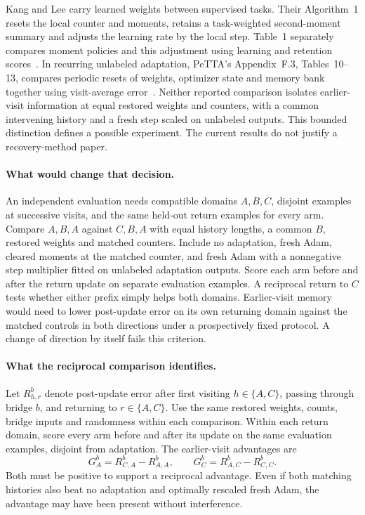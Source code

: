 \documentclass[11pt,a4paper]{article}
\begin{document}
Kang and Lee carry learned weights between supervised tasks. Their
Algorithm~1 resets the local counter and moments, retains a task-weighted
second-moment summary and adjusts the learning rate by the local step.
Table~1 separately compares moment policies and this adjustment using
learning and retention scores~\cite{continualadam}. In recurring
unlabeled adaptation, PeTTA's Appendix~F.3, Tables~10--13, compares
periodic resets of weights, optimizer state and memory bank together
using visit-average error~\cite{petta}. Neither reported comparison
isolates earlier-visit information at equal restored weights and counters,
with a common intervening history and a fresh step scaled on unlabeled
outputs. This bounded distinction defines a possible experiment.
The current results do not justify a recovery-method paper.

\paragraph{What would change that decision.}
An independent evaluation needs compatible domains $A,B,C$, disjoint
examples at successive visits, and the same held-out return examples
for every arm. Compare $A,B,A$ against $C,B,A$ with equal history
lengths, a common $B$, restored weights and matched counters. Include
no adaptation, fresh Adam, cleared moments at the matched counter, and
fresh Adam with a nonnegative step multiplier fitted on unlabeled
adaptation outputs. Score each arm before and after the return update
on separate evaluation examples. A reciprocal return to $C$ tests
whether either prefix simply helps both domains. Earlier-visit memory
would need to lower post-update error on its own returning domain
against the matched controls in both directions under a prospectively
fixed protocol. A change of direction by itself fails this criterion.

\paragraph{What the reciprocal comparison identifies.}
Let $R_{h,r}^{b}$ denote post-update error after first visiting
$h\in\{A,C\}$, passing through bridge $b$, and returning to $r\in\{A,C\}$.
Use the same restored weights, counts, bridge inputs and randomness within
each comparison. Within each return domain, score every arm before and
after its update on the same evaluation examples, disjoint from adaptation.
The earlier-visit advantages are
\[
 G_A^b=R_{C,A}^b-R_{A,A}^b,\qquad
 G_C^b=R_{A,C}^b-R_{C,C}^b .
\]
Both must be positive to support a reciprocal advantage. Even if both
matching histories also beat no adaptation and optimally rescaled fresh
Adam, the advantage may have been present without interference.
\end{document}
